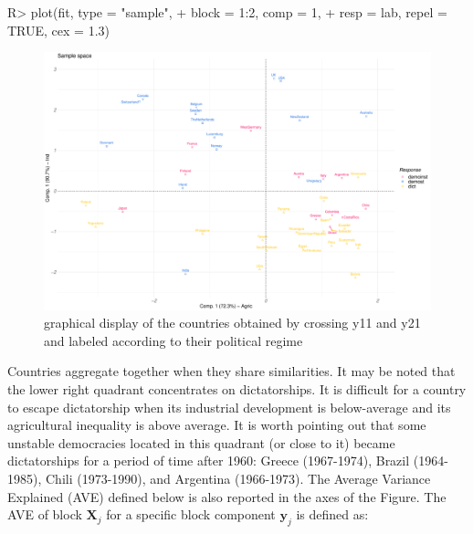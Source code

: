 \documentclass[
]{jss}
\begin{document}
\footnotesize

\begin{CodeChunk}
\begin{CodeInput}
R> plot(fit, type = "sample",
+      block = 1:2, comp = 1,
+      resp = lab, repel = TRUE, cex = 1.3)
\end{CodeInput}
\begin{figure}

{\centering \includegraphics{RGCCA_vignette_files/figure-latex/unnamed-chunk-8-1} 

}

\caption[graphical display of the countries obtained by crossing y11 and y21 and labeled according to their political regime]{graphical display of the countries obtained by crossing y11 and y21 and labeled according to their political regime}\label{fig:unnamed-chunk-8}
\end{figure}
\end{CodeChunk}

\normalsize

Countries aggregate together when they share similarities. It may be
noted that the lower right quadrant concentrates on dictatorships. It is
difficult for a country to escape dictatorship when its industrial
development is below-average and its agricultural inequality is above
average. It is worth pointing out that some unstable democracies located
in this quadrant (or close to it) became dictatorships for a period of
time after 1960: Greece (1967-1974), Brazil (1964-1985), Chili
(1973-1990), and Argentina (1966-1973). The Average Variance Explained
(AVE) defined below is also reported in the axes of the Figure. The AVE
of block \(\mathbf{X}_j\) for a specific block component
\(\mathbf{y}_j\) is defined as:
\end{document}
